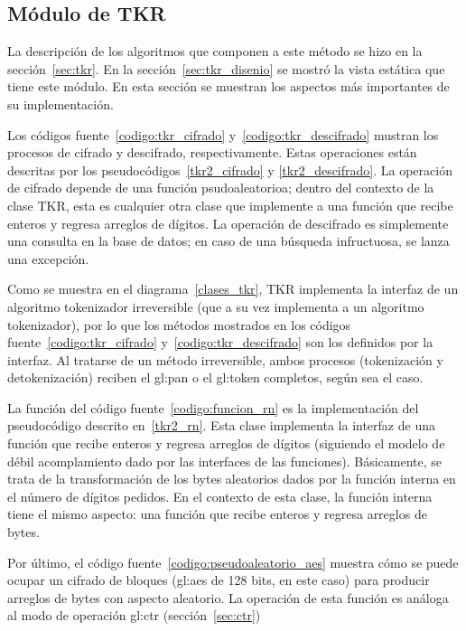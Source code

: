 %
%
%

\subsection{Módulo de TKR}

La descripción de los algoritmos que componen a este método se hizo en la
sección~\ref{sec:tkr}. En la sección~\ref{sec:tkr_disenio} se mostró la vista
estática que tiene este módulo. En esta sección se muestran los aspectos más
importantes de su implementación.



Los códigos fuente~\ref{codigo:tkr_cifrado} y~\ref{codigo:tkr_descifrado}
mustran los procesos de cifrado y descifrado, respectivamente. Estas operaciones
están descritas por los pseudocódigos~\ref{tkr2_cifrado} y
\ref{tkr2_descifrado}. La operación de cifrado depende de una función
psudoaleatorioa; dentro del contexto de la clase TKR, esta es cualquier
otra clase que implemente a una función que recibe enteros y regresa
arreglos de dígitos. La operación de descifrado es simplemente una consulta
en la base de datos; en caso de una búsqueda infructuosa, se lanza una
excepción.

Como se muestra en el diagrama~\ref{clases_tkr}, TKR implementa la interfaz
de un algoritmo tokenizador irreversible (que a su vez implementa a un
algoritmo tokenizador), por lo que los métodos mostrados en los códigos
fuente~\ref{codigo:tkr_cifrado} y~\ref{codigo:tkr_descifrado} son
los definidos por la interfaz. Al tratarse de un método irreversible,
ambos procesos (tokenización y detokenización) reciben el \gls{gl:pan} o el
\gls{gl:token} completos, según sea el caso.


La función del código fuente~\ref{codigo:funcion_rn} es la implementación del
pseudocódigo descrito en~\ref{tkr2_rn}. Esta clase implementa la
interfaz de una función que recibe enteros y regresa arreglos de dígitos
(siguiendo el modelo de débil acomplamiento dado por las interfaces de
las funciones). Básicamente, se trata de la transformación de
los bytes aleatorios dados por la función interna en el número de
dígitos pedidos. En el contexto de esta clase, la función interna tiene
el mismo aspecto: una función que recibe enteros y regresa arreglos de bytes.


Por último, el código fuente~\ref{codigo:pseudoaleatorio_aes} muestra
cómo se puede ocupar un cifrado de bloques (\gls{gl:aes} de 128 bits, en
este caso) para producir arreglos de bytes con aspecto aleatorio. La
operación de esta función es análoga al modo de operación \gls{gl:ctr}
(sección~\ref{sec:ctr})
